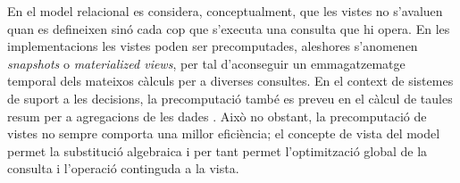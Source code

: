 En el model relacional \cite[cap.~10. Views]{date04:introduction8} es
considera, conceptualment, que les vistes no s'avaluen quan es
defineixen sinó cada cop que s'executa una consulta que hi opera.  En
les implementacions les vistes poden ser precomputades, aleshores
s'anomenen \emph{snapshots} o \emph{materialized views}, per tal
d'aconseguir un emmagatzematge temporal dels mateixos càlculs per a
diverses consultes. En el context de sistemes de suport a les
decisions, la precomputació també es preveu en el càlcul de taules
resum per a agregacions de les dades \cite[cap.~22. Decision
support]{date04:introduction8}.  Això no obstant, la precomputació de
vistes no sempre comporta una millor eficiència; el concepte de vista
del model permet la substitució algebraica i per tant permet
l'optimització global de la consulta i l'operació continguda a la
vista.








